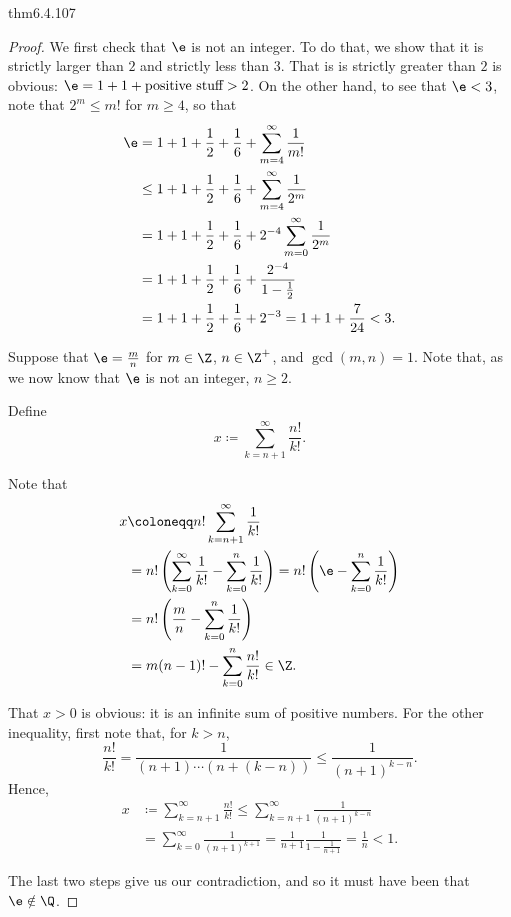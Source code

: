 \begin{thm}{}{thm6.4.107}
\begin{proof}
We first check that $\e$ is not an integer.  To do that, we show that it is strictly larger than $2$ and strictly less than $3$.  That is is strictly greater than $2$ is obvious:  $\e =1+1+\text{positive stuff}>2$.  On the other hand, to see that $\e <3$, note that $2^m\leq m!$ for $m\geq 4$, so that
\begin{equation}
\begin{split}
\e & =1+1+\frac{1}{2}+\frac{1}{6}+\sum _{m=4}^{\infty}\frac{1}{m!} \\
& \leq 1+1+\frac{1}{2}+\frac{1}{6}+\sum _{m=4}^{\infty}\frac{1}{2^m} \\
& =1+1+\frac{1}{2}+\frac{1}{6}+2^{-4}\sum _{m=0}^{\infty}\frac{1}{2^m} \\
& =1+1+\frac{1}{2}+\frac{1}{6}+\frac{2^{-4}}{1-\tfrac{1}{2}} \\
& =1+1+\frac{1}{2}+\frac{1}{6}+2^{-3}=1+1+\frac{7}{24}<3.
\end{split}
\end{equation}

Suppose that $\e =\frac{m}{n}$ for $m\in \Z$, $n\in \Z ^+$, and $\gcd (m,n)=1$.  Note that, as we now know that $\e$ is not an integer, $n\geq 2$.

Define
\begin{equation}
x\coloneqq \sum _{k=n+1}^{\infty}\frac{n!}{k!}.
\end{equation}

Note that
\begin{equation}
\begin{split}
x & \coloneqq n!\sum _{k=n+1}^{\infty}\frac{1}{k!} \\
& =n!\left( \sum _{k=0}^{\infty}\frac{1}{k!}-\sum _{k=0}^n\frac{1}{k!}\right) =n!\left( \e -\sum _{k=0}^n\frac{1}{k!}\right) \\
& =n!\left( \frac{m}{n}-\sum _{k=0}^n\frac{1}{k!}\right) \\
& =m(n-1)!-\sum _{k=0}^n\frac{n!}{k!}\in \Z .
\end{split}
\end{equation}

That $x>0$ is obvious:  it is an infinite sum of positive numbers.  For the other inequality, first note that, for $k>n$,
\begin{equation}
\frac{n!}{k!}=\frac{1}{(n+1)\cdots (n+(k-n))}\leq \frac{1}{(n+1)^{k-n}}.
\end{equation}
Hence,
\begin{equation}
\begin{split}
x & \coloneqq \sum _{k=n+1}^{\infty}\frac{n!}{k!}\leq \sum _{k=n+1}^{\infty}\frac{1}{(n+1)^{k-n}} \\
& =\sum _{k=0}^{\infty}\frac{1}{(n+1)^{k+1}}=\frac{1}{n+1}\frac{1}{1-\tfrac{1}{n+1}}=\frac{1}{n}<1.
\end{split}
\end{equation}

The last two steps give us our contradiction, and so it must have been that $\e \notin \Q$.
\end{proof}
\end{thm}

